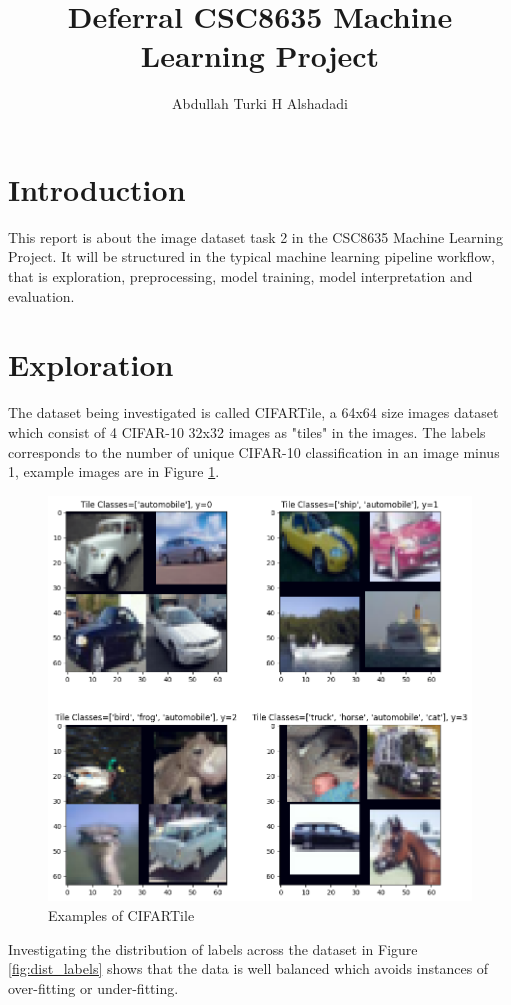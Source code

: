 \documentclass{article}
\title{Deferral CSC8635 Machine Learning Project}
\author{Abdullah Turki H Alshadadi}
\date{}
\begin{document}
\maketitle

\section{Introduction}

This report is about the image dataset task 2 in the CSC8635
Machine Learning Project. It will be structured in the typical
machine learning pipeline workflow, that is exploration, 
preprocessing, model training, model interpretation and 
evaluation.

\section{Exploration} \label{exploration}

The dataset being investigated is called CIFARTile, a 64x64
size images dataset which consist of 4 CIFAR-10 32x32 images as "tiles" in
the images. The labels corresponds to the number of unique CIFAR-10 
classification in an image minus 1, example images are in Figure \ref{fig:cifartile}.

\begin{figure}[H]
    \centering
    \includegraphics[width=0.7\linewidth]{images/cifartile.png}
    \caption{Examples of CIFARTile}
    \label{fig:cifartile}
\end{figure}

Investigating the distribution of labels across the dataset in 
Figure \ref{fig:dist_labels} shows that the data is well 
balanced which avoids instances of over-fitting or under-fitting.
\end{document}
